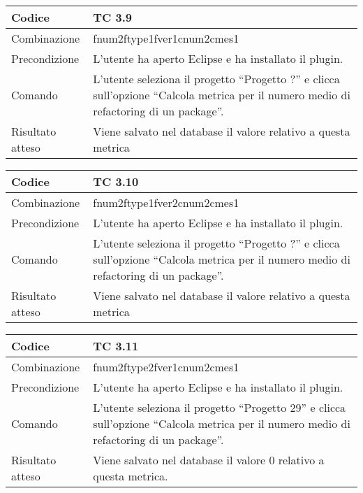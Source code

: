 \begin{table}[ht]
\begin{tabular}{|p{3cm}|p{9cm}|}
\hline
\cellcolor{lightgray}Codice				& TC 3.9								\\
\hline
\cellcolor{lightgray}Combinazione		& fnum2ftype1fver1cnum2cmes1 									\\
\hline
\cellcolor{lightgray}Precondizione		& L'utente ha aperto Eclipse e ha installato il plugin.								\\
\hline
\cellcolor{lightgray}Comando			& L'utente seleziona il progetto ``Progetto ?''  e clicca sull'opzione ``Calcola metrica per il numero medio di refactoring di un package''.	\\
\hline
\cellcolor{lightgray}Risultato atteso	& Viene salvato nel database il valore relativo a questa metrica	\\
\hline
\end{tabular}
\end{table}

\begin{table}[ht]
\begin{tabular}{|p{3cm}|p{9cm}|}
\hline
\cellcolor{lightgray}Codice				& TC 3.10								\\
\hline
\cellcolor{lightgray}Combinazione		& fnum2ftype1fver2cnum2cmes1 									\\
\hline
\cellcolor{lightgray}Precondizione		& L'utente ha aperto Eclipse e ha installato il plugin.									\\
\hline
\cellcolor{lightgray}Comando			& L'utente seleziona il progetto ``Progetto ?''  e clicca sull'opzione ``Calcola metrica per il numero medio di refactoring di un package''.	\\
\hline
\cellcolor{lightgray}Risultato atteso	& Viene salvato nel database il valore relativo a questa metrica	\\
\hline
\end{tabular}
\end{table}

\clearpage

\begin{table}[ht]
\begin{tabular}{|p{3cm}|p{9cm}|}
\hline
\cellcolor{lightgray}Codice				& TC 3.11								\\
\hline
\cellcolor{lightgray}Combinazione		& fnum2ftype2fver1cnum2cmes1 									\\
\hline
\cellcolor{lightgray}Precondizione		& L'utente ha aperto Eclipse e ha installato il plugin.		\\
\hline
\cellcolor{lightgray}Comando			& L'utente seleziona il progetto ``Progetto 29''  e clicca sull'opzione ``Calcola metrica per il numero medio di refactoring di un package''.	\\
\hline
\cellcolor{lightgray}Risultato atteso	& Viene salvato nel database il valore 0 relativo a questa metrica.\\
\hline
\end{tabular}
\end{table}

